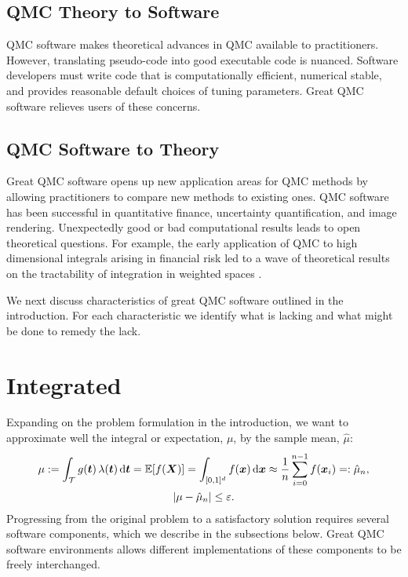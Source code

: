 \documentclass[graybox]{svmult}
\begin{document}
\subsection{QMC Theory to Software}

QMC software makes theoretical advances in QMC available to practitioners. However, translating pseudo-code into good executable code is nuanced.  Software developers must write code that is computationally efficient, numerical stable, and provides reasonable default choices of tuning parameters. Great QMC software relieves users of these concerns.

\subsection{QMC Software to Theory}

Great QMC software opens up new application areas for QMC methods by allowing practitioners to compare new methods to existing ones.  QMC software has been successful in quantitative finance, uncertainty quantification, and image rendering. Unexpectedly good or bad computational results leads to open theoretical questions.  For example, the early application of QMC to high dimensional integrals arising in financial risk \cite{PasTra95} led to a wave of theoretical results on the tractability of integration in weighted spaces \cite{Woz99a,DicEtal14a,NovWoz10a}.

We next discuss characteristics of great QMC software outlined in the introduction.  For each characteristic we identify what is lacking and what might be done to remedy the lack.

\section{Integrated} \label{CDHJS_sec:integrated}

Expanding on the problem formulation in the introduction, we want to approximate well the integral or expectation, $\mu$, by the sample mean, $\hat{\mu}$:
\begin{gather}
\label{eq:cubSummary}
	\mu : = \int_\calT g(\bst) \, \lambda(\bst) \, \D \bst  = \bbE[f(\bsX)] = \int_{[0,1]^d} f(\bsx)  \, \D \bsx \approx \frac 1n \sum_{i=0}^{n-1} f(\bsx_i) =: \hat{\mu}_n, \\
 \label{CDHJS_eq:error_tol}
 \abs{\mu - \hat{\mu}_n} \le \varepsilon.
\end{gather}
Progressing from the original problem to a satisfactory solution requires several software components, which we describe in the subsections below.  Great QMC software environments allows different implementations of these components to be freely interchanged.
\end{document}
